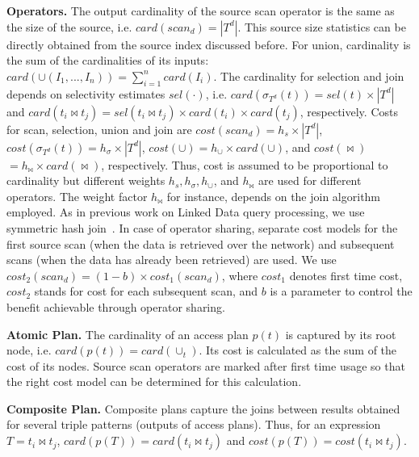 \textbf{Operators.} The output cardinality of the source scan operator is the same as the size of the source, i.e. $card(scan_d) = |T^d|$. 
This source size statistics can be directly obtained from the source index discussed before. 
For union, cardinality is the sum of the cardinalities of its inputs: $card(\cup(I_1,...,I_n)) = \sum_{i=1}^n card(I_i)$. 
The cardinality for selection and join depends on selectivity estimates $sel(\cdot)$, i.e. $card(\sigma_{T^d}(t)) = sel(t) \times |T^d|$ and $card(t_i \Join t_j) =
sel(t_i \Join t_j) \times card(t_i) \times card(t_j)$, respectively. 
Costs for scan, selection, union and join are $cost(scan_d) = h_s \times |T^d|$, $cost(\sigma_{T^d}(t))=h_\sigma \times |T^d|$, $cost(\cup) =
h_\cup \times card(\cup)$, and $cost(\Join)$ $=
h_\Join \times card(\Join)$, respectively. Thus, cost is assumed to be proportional to cardinality but different weights $h_s,h_\sigma,h_\cup$, and $h_\Join$ are used for different operators. The weight factor $h_\Join$ for instance, depends on the
join algorithm employed. As in previous work on Linked Data query processing, we use symmetric hash join~\cite{ladwig_linked_2010,sihjoin_2011}. In case of operator sharing, separate cost
models for the first source scan (when the data is retrieved over the
network) and subsequent scans (when the data has already been
retrieved) are used. We use $cost_2(scan_d) = (1 - b) \times cost_1(scan_d)$, where $cost_1$ denotes first time cost, $cost_2$ stands for cost for each subsequent scan, and $b$
is a parameter to control the benefit achievable through operator sharing.


\textbf{Atomic Plan.} The cardinality of an access plan $p(t)$ is captured by its root node, i.e. $card(p(t)) = card(\cup_t)$. Its cost is calculated as the sum of the cost of its nodes. Source scan operators are marked after first time usage so that the right cost model can be determined for this calculation. 

\textbf{Composite Plan.} Composite plans capture the joins between results obtained for several triple patterns (outputs of access plans). Thus, for an expression $T = t_i\Join t_j$, $card(p(T))  = card(t_i\Join t_j)$ and $cost(p(T))  = cost(t_i\Join t_j)$.


